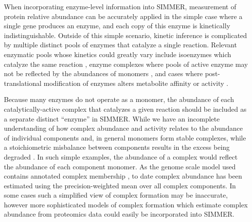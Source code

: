 When incorporating enzyme-level information into SIMMER, measurement of protein relative abundance can be accurately applied in the simple case where a single gene produces an enzyme, and each copy of this enzyme is kinetically indistinguishable. Outside of this simple scenario, kinetic inference is complicated by multiple distinct pools of enzymes that catalyze a single reaction. Relevant enzymatic pools whose kinetics could greatly vary include isoenzymes which catalyze the same reaction \cite{Wilson:2003cb}, enzyme complexes where pools of active enzyme may not be reflected by the abundances of monomers \cite{Cohen:2000bj}, and cases where post-translational modification of enzymes alters metabolite affinity or activity \cite{Cohen:2000bj, Schulz:2014eo}. 

Because many enzymes do not operate as a monomer, the abundance of each catalytically-active complex that catalyzes a given reaction should be included as a separate distinct ``enzyme'' in SIMMER. While we have an incomplete understanding of how complex abundance and activity relates to the abundance of individual components and, in general monomers form stable complexes, while a stoichiometric misbalance between components results in the excess being degraded \cite{Marianayagam:2004ie}. In such simple examples, the abundance of a complex would reflect the abundance of each component monomer.  As the genome scale model used contains annotated complex membership \cite{BenjaminDHeavner:2013bp}, to date complex abundance has been estimated using the precision-weighted mean over all complex components. In some cases such a simplified view of complex formation may be inaccurate, however more sophisticated models of complex formation which estimate complex abundance from proteomics data could easily be incorporated into SIMMER.
 

